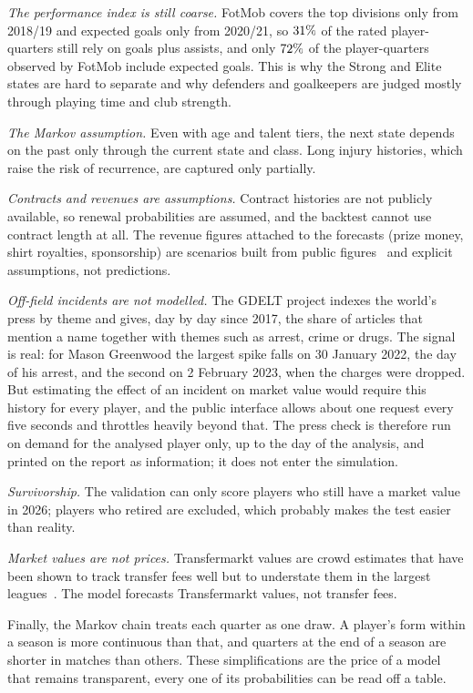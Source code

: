 \documentclass[11pt]{amsart}
\theoremstyle{definition}
\theoremstyle{remark}
\begin{document}
\emph{The performance index is still coarse.} FotMob covers the top divisions only from 2018/19 and expected goals only from 2020/21, so $31\%$ of the rated player-quarters still rely on goals plus assists, and only $72\%$ of the player-quarters observed by FotMob include expected goals. This is why the Strong and Elite states are hard to separate and why defenders and goalkeepers are judged mostly through playing time and club strength.

\emph{The Markov assumption.} Even with age and talent tiers, the next state depends on the past only through the current state and class. Long injury histories, which raise the risk of recurrence, are captured only partially.

\emph{Contracts and revenues are assumptions.} Contract histories are not publicly available, so renewal probabilities are assumed, and the backtest cannot use contract length at all. The revenue figures attached to the forecasts (prize money, shirt royalties, sponsorship) are scenarios built from public figures~\cite{uefa,deloitte} and explicit assumptions, not predictions.

\emph{Off-field incidents are not modelled.} The GDELT project indexes the world's press by theme and gives, day by day since 2017, the share of articles that mention a name together with themes such as arrest, crime or drugs. The signal is real: for Mason Greenwood the largest spike falls on 30 January 2022, the day of his arrest, and the second on 2 February 2023, when the charges were dropped. But estimating the effect of an incident on market value would require this history for every player, and the public interface allows about one request every five seconds and throttles heavily beyond that. The press check is therefore run on demand for the analysed player only, up to the day of the analysis, and printed on the report as information; it does not enter the simulation.

\emph{Survivorship.} The validation can only score players who still have a market value in 2026; players who retired are excluded, which probably makes the test easier than reality.

\emph{Market values are not prices.} Transfermarkt values are crowd estimates that have been shown to track transfer fees well but to understate them in the largest leagues~\cite{coates}. The model forecasts Transfermarkt values, not transfer fees.

Finally, the Markov chain treats each quarter as one draw. A player's form within a season is more continuous than that, and quarters at the end of a season are shorter in matches than others. These simplifications are the price of a model that remains transparent, every one of its probabilities can be read off a table.
\end{document}
